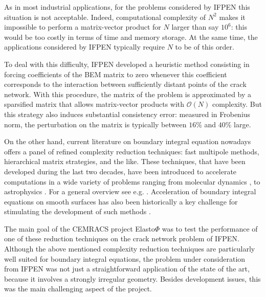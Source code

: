 \bigskip
As in most industrial applications, for the problems considered by IFPEN this situation is not acceptable. 
Indeed, computational complexity of $N^{2}$ makes it impossible to perform a matrix-vector product for $N$ larger than
say $10^{6}$: this would be too costly in terms of time and memory storage. At the same time, the  applications 
considered by IFPEN typically require $N$ to be of this order.

\bigskip
To deal with this difficulty, IFPEN developed a heuristic method consisting in forcing coefficients of the 
BEM matrix to zero whenever this coefficient corresponds to the interaction between sufficiently distant points 
of the crack network. With this procedure, the matrix of the problem is approximated by a sparsified matrix that 
allows matrix-vector products with $\mathcal{O}(N)$ complexity. But this strategy also induces substantial consistency 
error: measured in Frobenius norm, the perturbation on the matrix is typically between $16$\% and $40$\% large.

\bigskip
On the other hand, current literature on boundary integral equation nowadays offers a panel of refined complexity reduction 
techniques: fast multipole methods, hierarchical matrix strategies, and the like. These techniques, that have been developed 
during the last two decades, have been introduced to accelerate computations in a wide variety of problems ranging from molecular 
dynamics \cite{BOARD199289}, to astrophysics \cite{BarnesHut}. For a general overview see e.g. \cite{Greengard}. Acceleration of 
boundary integral equations on smooth surfaces has also been historically a key challenge for stimulating the development of 
such methods \cite{MR805870}.

\bigskip
The main goal of the CEMRACS project Elasto$\Phi$ was to test the performance of one of these reduction techniques on the 
crack network problem of IFPEN. Although the above mentioned complexity reduction techniques are particularly well suited  
for boundary integral equations, the problem under consideration from IFPEN was not just a straightforward application of 
the state of the art, because it involves a strongly irregular geometry. Besides development issues, this was the main 
challenging  aspect of the project.

